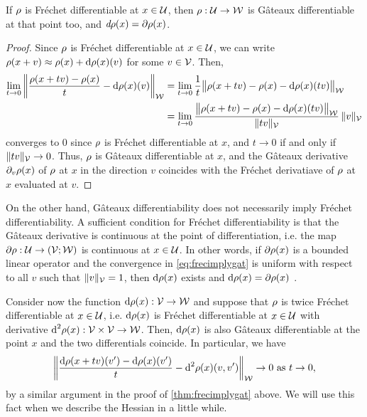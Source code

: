 \begin{lemma}\label{thm:frecimplygat}
  If $\rho$ is Fréchet differentiable at $x\in{\mathcal U}$, then $\rho :{\mathcal U}\to{\mathcal W}$ is Gâteaux differentiable at that point too, and $\emph{d} \rho(x) = \partial \rho(x)$.
\end{lemma}

\begin{proof}
  Since $\rho$ is Fréchet differentiable at $x\in{\mathcal U}$, we can write $\rho(x+v) \approx \rho(x) + \text{d} \rho(x)(v)$ for some $v\in{\mathcal V}$.
  Then, 
  \begin{align}\label{eq:frecimplygat}
    \lim_{t\to 0}   \left\Vert \frac{\funder(x + t v) - \funder(x)}{t} - \d \funder(x)(v) \right\Vert_\cW 
    &%
    = \lim_{t\to 0} \frac{1}{t} \big\Vert \funder(x + t v) - \funder(x) - \d \funder(x)(tv)  \big\Vert_\cW \nonumber \\
    &%
    = \lim_{t\to 0} \frac{\big\Vert \funder(x + t v) - \funder(x) - \d \funder(x)(tv) \big\Vert_\cW }{\norm{tv}_\cV} \, \norm{v}_\cV  
  \end{align}
  converges to 0 since $\rho$ is Fréchet differentiable at $x$, and  $t\to 0$ if and only if $\lVert tv\rVert_{\mathcal V} \to 0$.
  Thus, $\rho$ is Gâteaux differentiable at $x$, and the Gâteaux derivative $\partial_v \rho(x)$ of $\rho$ at $x$ in the direction $v$ coincides with the Fréchet derivatiave of $\rho$ at $x$ evaluated at $v$.
\end{proof}

On the other hand, Gâteaux differentiability does not necessarily imply Fréchet differentiability.
A sufficient condition for Fréchet differentiability is  that the Gâteaux derivative is continuous at the point of differentiation, i.e. the map $\partial \rho : {\mathcal U} \to ({\mathcal V};{\mathcal W})$ is continuous at $x\in{\mathcal U}$.
In other words, if $\partial \rho(x)$ is a bounded linear operator and the convergence in \cref{eq:frecimplygat} is uniform with respect to all $v$ such that $\lVert v\rVert_{\mathcal V}=1$, then $\text{d} \rho(x)$ exists and $\text{d} \rho(x) = \partial \rho(x)$ \citep[p. 57 \& 66]{tapia1971diff}.

Consider now the function $\text{d} \rho(x):{\mathcal V}\to{\mathcal W}$ and suppose that $\rho$ is twice Fréchet differentiable at $x\in{\mathcal U}$, i.e. $\text{d} \rho(x)$ is Fréchet differentiable at $x\in{\mathcal U}$ with derivative $\text{d}^2 \rho(x):{\mathcal V}\times{\mathcal V} \to {\mathcal W}$.
Then, $\text{d} \rho(x)$ is also Gâteaux differentiable at the point $x$ and the two differentials coincide.
In particular, we have
\begin{align}\label{eq:frech2gat}
  \left\Vert \frac{\text{d} \rho(x + t v)(v') - \text{d} \rho(x)(v')}{t} - \text{d}^2 \rho(x)(v,v') \right\Vert_{\mathcal W} \to 0 \text{ as } t \to 0,
\end{align}
by a similar argument in the proof of \cref{thm:frecimplygat} above.
We will use this fact when we describe the Hessian in a little while.

